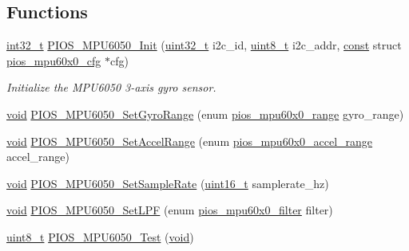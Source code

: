 \subsection*{Functions}
\begin{DoxyCompactItemize}
\item 
\hyperlink{group___n_a_m_e_gafd12020da5a235dfcf0c3c748fb5baed}{int32\-\_\-t} \hyperlink{group___p_i_o_s___m_p_u6050_gac57f42dba9e222c61a1584c67d6874be}{P\-I\-O\-S\-\_\-\-M\-P\-U6050\-\_\-\-Init} (\hyperlink{stdint_8h_a435d1572bf3f880d55459d9805097f62}{uint32\-\_\-t} i2c\-\_\-id, \hyperlink{stdint_8h_aba7bc1797add20fe3efdf37ced1182c5}{uint8\-\_\-t} i2c\-\_\-addr, \hyperlink{group___n_a_m_e_ga7ae6d0e43244213b34de2c2b9aa30da6}{const} struct \hyperlink{structpios__mpu60x0__cfg}{pios\-\_\-mpu60x0\-\_\-cfg} $\ast$cfg)
\begin{DoxyCompactList}\small\item\em Initialize the M\-P\-U6050 3-\/axis gyro sensor. \end{DoxyCompactList}\item 
\hyperlink{group___n_a_m_e_ga18028b8badbf1ea7e704ccac3c488e82}{void} \hyperlink{group___p_i_o_s___m_p_u6050_ga895ee6650c95651c9b6bb12d94181c79}{P\-I\-O\-S\-\_\-\-M\-P\-U6050\-\_\-\-Set\-Gyro\-Range} (enum \hyperlink{group___p_i_o_s___m_p_u60_x0_ga56700b0154a14cf67c9f8f44a86ad9c0}{pios\-\_\-mpu60x0\-\_\-range} gyro\-\_\-range)
\item 
\hyperlink{group___n_a_m_e_ga18028b8badbf1ea7e704ccac3c488e82}{void} \hyperlink{group___p_i_o_s___m_p_u6050_gada6357c3fb3a3911929c525730194b83}{P\-I\-O\-S\-\_\-\-M\-P\-U6050\-\_\-\-Set\-Accel\-Range} (enum \hyperlink{group___p_i_o_s___m_p_u60_x0_ga8f297bddae3eb43bbf7b54abc6494992}{pios\-\_\-mpu60x0\-\_\-accel\-\_\-range} accel\-\_\-range)
\item 
\hyperlink{group___n_a_m_e_ga18028b8badbf1ea7e704ccac3c488e82}{void} \hyperlink{group___p_i_o_s___m_p_u6050_ga812644156bea8701f60a0da46b4ad5e7}{P\-I\-O\-S\-\_\-\-M\-P\-U6050\-\_\-\-Set\-Sample\-Rate} (\hyperlink{stdint_8h_a273cf69d639a59973b6019625df33e30}{uint16\-\_\-t} samplerate\-\_\-hz)
\item 
\hyperlink{group___n_a_m_e_ga18028b8badbf1ea7e704ccac3c488e82}{void} \hyperlink{group___p_i_o_s___m_p_u6050_ga5965e8d1b3d1ecdef09ccf03a3dfa3c0}{P\-I\-O\-S\-\_\-\-M\-P\-U6050\-\_\-\-Set\-L\-P\-F} (enum \hyperlink{group___p_i_o_s___m_p_u60_x0_gacce1988bc994f5ade6ac748c2bf0b924}{pios\-\_\-mpu60x0\-\_\-filter} filter)
\item 
\hyperlink{stdint_8h_aba7bc1797add20fe3efdf37ced1182c5}{uint8\-\_\-t} \hyperlink{group___p_i_o_s___m_p_u6050_ga6ccccbd6fe0ebfa82dcc4a5481a336dc}{P\-I\-O\-S\-\_\-\-M\-P\-U6050\-\_\-\-Test} (\hyperlink{group___n_a_m_e_ga18028b8badbf1ea7e704ccac3c488e82}{void})

\end{DoxyCompactItemize}
